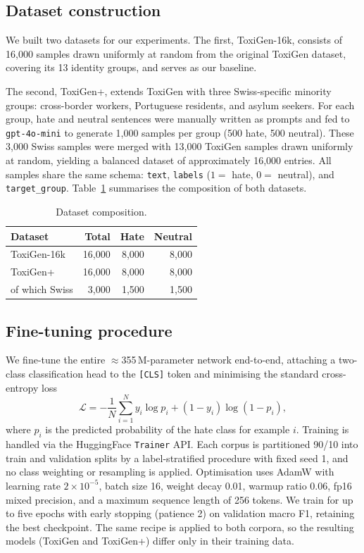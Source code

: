 \documentclass{article}
\begin{document}
\subsection{Dataset construction}
We built two datasets for our experiments. The first, ToxiGen-16k, consists of 16,000 samples drawn uniformly at random from the original ToxiGen dataset, covering its 13 identity groups, and serves as our baseline.

The second, ToxiGen+, extends ToxiGen with three Swiss-specific minority groups: cross-border workers, Portuguese residents, and asylum seekers. For each group, hate and neutral sentences were manually written as prompts and fed to \texttt{gpt-4o-mini} to generate 1,000 samples per group (500 hate, 500 neutral). These 3,000 Swiss samples were merged with 13,000 ToxiGen samples drawn uniformly at random, yielding a balanced dataset of approximately 16,000 entries. All samples share the same schema: \texttt{text}, \texttt{labels} ($1 =$ hate, $0 =$ neutral), and \texttt{target\_group}. Table~\ref{tab:datasets} summarises the composition of both datasets.

\begin{table}[H]
\centering
\caption{Dataset composition.}
\label{tab:datasets}
\small
\begin{tabular}{lrrr}
\hline
\textbf{Dataset} & \textbf{Total} & \textbf{Hate} & \textbf{Neutral} \\
\hline
ToxiGen-16k & 16{,}000 & 8{,}000 & 8{,}000 \\
ToxiGen+ & 16{,}000 & 8{,}000 & 8{,}000 \\
\quad of which Swiss & 3{,}000 & 1{,}500 & 1{,}500 \\
\hline
\end{tabular}
\end{table}

\subsection{Fine-tuning procedure}
We fine-tune the entire $\approx$355\,M-parameter network end-to-end, attaching a two-class classification head to the \texttt{[CLS]} token and minimising the standard cross-entropy loss
\begin{equation}
  \mathcal{L} = -\frac{1}{N}\sum_{i=1}^{N} y_i \log p_i + (1-y_i)\log(1-p_i),
  \label{eq:ce}
\end{equation}
where $p_i$ is the predicted probability of the hate class for example $i$. Training is handled via the HuggingFace \texttt{Trainer} API. Each corpus is partitioned 90/10 into train and validation splits by a label-stratified procedure with fixed seed 1, and no class weighting or resampling is applied. Optimisation uses AdamW with learning rate $2\times10^{-5}$, batch size 16, weight decay 0.01, warmup ratio 0.06, fp16 mixed precision, and a maximum sequence length of 256 tokens. We train for up to five epochs with early stopping (patience 2) on validation macro F1, retaining the best checkpoint. The same recipe is applied to both corpora, so the resulting models (ToxiGen and ToxiGen+) differ only in their training data.
\end{document}
